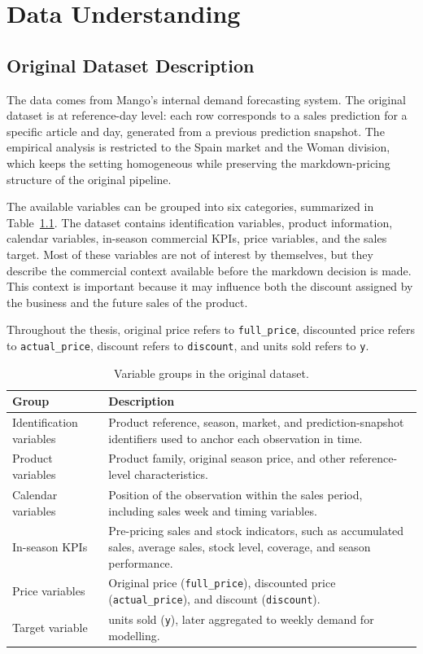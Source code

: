 \chapter{Data Understanding}

\label{Chapter2}

\section{Original Dataset Description}

The data comes from Mango's internal demand forecasting system. The original dataset is at reference-day level: each row corresponds to a sales prediction for a specific article and day, generated from a previous prediction snapshot. The empirical analysis is restricted to the Spain market and the Woman division, which keeps the setting homogeneous while preserving the markdown-pricing structure of the original pipeline.

The available variables can be grouped into six categories, summarized in Table~\ref{tab:original-dataset-groups}. The dataset contains identification variables, product information, calendar variables, in-season commercial KPIs, price variables, and the sales target. Most of these variables are not of interest by themselves, but they describe the commercial context available before the markdown decision is made. This context is important because it may influence both the discount assigned by the business and the future sales of the product.

Throughout the thesis, original price refers to \mbox{\texttt{full\_price}}, discounted price refers to \mbox{\texttt{actual\_price}}, discount refers to \mbox{\texttt{discount}}, and units sold refers to \mbox{\texttt{y}}.

\begin{table}[h]
\centering
\small
\begin{tabularx}{\textwidth}{p{3.0cm} X}
\textbf{Group} & \textbf{Description} \\
\hline
Identification variables & Product reference, season, market, and prediction-snapshot identifiers used to anchor each observation in time. \\
Product variables & Product family, original season price, and other reference-level characteristics. \\
Calendar variables & Position of the observation within the sales period, including sales week and timing variables. \\
In-season KPIs & Pre-pricing sales and stock indicators, such as accumulated sales, average sales, stock level, coverage, and season performance. \\
Price variables & Original price (\mbox{\texttt{full\_price}}), discounted price (\mbox{\texttt{actual\_price}}), and discount (\mbox{\texttt{discount}}). \\
Target variable & units sold (\texttt{y}), later aggregated to weekly demand for modelling. \\
\end{tabularx}
\caption{Variable groups in the original dataset.}
\label{tab:original-dataset-groups}
\end{table}

